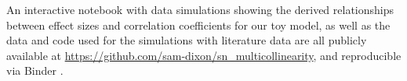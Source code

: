 An interactive notebook with data simulations showing the derived relationships between effect sizes and correlation coefficients for our toy model, as well as the data and code used for the simulations with literature data are all publicly available at \url{https://github.com/sam-dixon/sn_multicollinearity}, and reproducible via Binder \citep{jupyter_binder_2018}.
